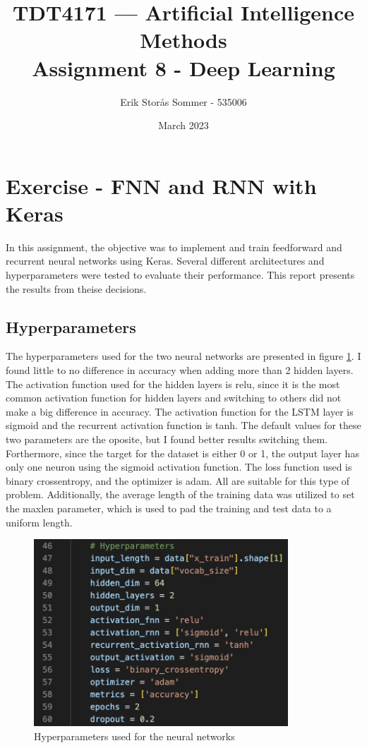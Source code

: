 \documentclass{article}
\title{TDT4171 — Artificial Intelligence Methods \\ Assignment 8 - Deep Learning}
\author{Erik Storås Sommer - 535006}
\date{March 2023}
\begin{document}
\maketitle
\setlength{\parindent}{0pt}

\section*{Exercise - FNN and RNN with Keras}

In this assignment, the objective was to implement and train feedforward and recurrent neural networks using Keras.
Several different architectures and hyperparameters were tested to evaluate their performance.
This report presents the results from theise decisions.

\subsection*{Hyperparameters}

The hyperparameters used for the two neural networks are presented in figure \ref{fig:image1}. I found little to no difference in accuracy when adding more than 2 hidden layers.
The activation function used for the hidden layers is relu, since it is the most common activation function for hidden layers and switching to others did not make a big difference in accuracy.
The activation function for the LSTM layer is sigmoid and the recurrent activation function is tanh.
The default values for these two parameters are the oposite, but I found better results switching them.
Forthermore, since the target for the dataset is either 0 or 1, the output layer has only one neuron using the sigmoid activation function.
The loss function used is binary crossentropy, and the optimizer is adam.
All are suitable for this type of problem.
Additionally, the average length of the training data was utilized to set the maxlen parameter, which is used to pad the training and test data to a uniform length.

\begin{figure}[hbtp]
    \centering
    \includegraphics[width=0.85\textwidth]{hyperparameters.png}
    \caption{Hyperparameters used for the neural networks}
    \label{fig:image1}
\end{figure}
\end{document}
